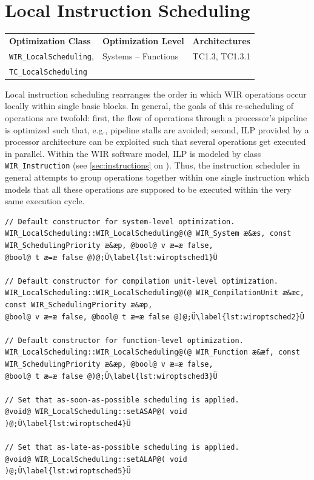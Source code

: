 \section{Local Instruction Scheduling}
\label{sec:optsched}

\begin{tabular}{|l|l|l|}
  \hline
  \textbf{Optimization Class} & \textbf{Optimization Level} & \textbf{Architectures} \\
  \hhline{|=|=|=|}
  \texttt{WIR\_LocalScheduling}, & Systems -- Functions & TC1.3, TC1.3.1 \\
  \texttt{TC\_LocalScheduling} & &  \\
  \hline
\end{tabular}

Local instruction scheduling rearranges the order in which \gls{WIR} operations occur locally within single basic blocks.
In general, the goals of this re-scheduling of operations are twofold: first, the flow of operations through a processor's pipeline is optimized such that, e.g., pipeline stalls are avoided; second, \gls{ILP} provided by a processor architecture can be exploited such that several operations get executed in parallel.
Within the \gls{WIR} software model, \gls{ILP} is modeled by class \texttt{WIR\_Instruction} (see \cref{sec:instructions} on ).
Thus, the instruction scheduler in general attempts to group operations together within one single instruction which models that all these operations are supposed to be executed within the very same execution cycle.

\begin{lstlisting}[style=code,float=!b,caption={Public Interface of Class \texttt{WIR\_LocalScheduling}},label=lst:wiroptsched]
// Default constructor for system-level optimization.
WIR_LocalScheduling::WIR_LocalScheduling@(@ WIR_System æ&æs, const WIR_SchedulingPriority æ&æp, @bool@ v æ=æ false,                                           @bool@ t æ=æ false @)@;Ü\label{lst:wiroptsched1}Ü

// Default constructor for compilation unit-level optimization.
WIR_LocalScheduling::WIR_LocalScheduling@(@ WIR_CompilationUnit æ&æc, const WIR_SchedulingPriority æ&æp,                                                  @bool@ v æ=æ false, @bool@ t æ=æ false @)@;Ü\label{lst:wiroptsched2}Ü

// Default constructor for function-level optimization.
WIR_LocalScheduling::WIR_LocalScheduling@(@ WIR_Function æ&æf, const WIR_SchedulingPriority æ&æp, @bool@ v æ=æ false,                                         @bool@ t æ=æ false @)@;Ü\label{lst:wiroptsched3}Ü

// Set that as-soon-as-possible scheduling is applied.
@void@ WIR_LocalScheduling::setASAP@( void )@;Ü\label{lst:wiroptsched4}Ü

// Set that as-late-as-possible scheduling is applied.
@void@ WIR_LocalScheduling::setALAP@( void )@;Ü\label{lst:wiroptsched5}Ü
\end{lstlisting}

